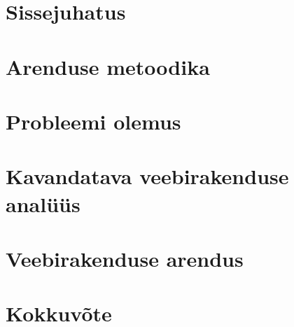\chapter{Sissejuhatus}\label{chapter:introduction}


\chapter{Arenduse metoodika}\label{chapter:metodology}


\chapter{Probleemi olemus}\label{chapter:problem_statement}


\chapter{Kavandatava veebirakenduse analüüs}\label{chapter:analysis}


\chapter{Veebirakenduse arendus}\label{chapter:development}



\chapter{Kokkuvõte}\label{chapter:summary} 

